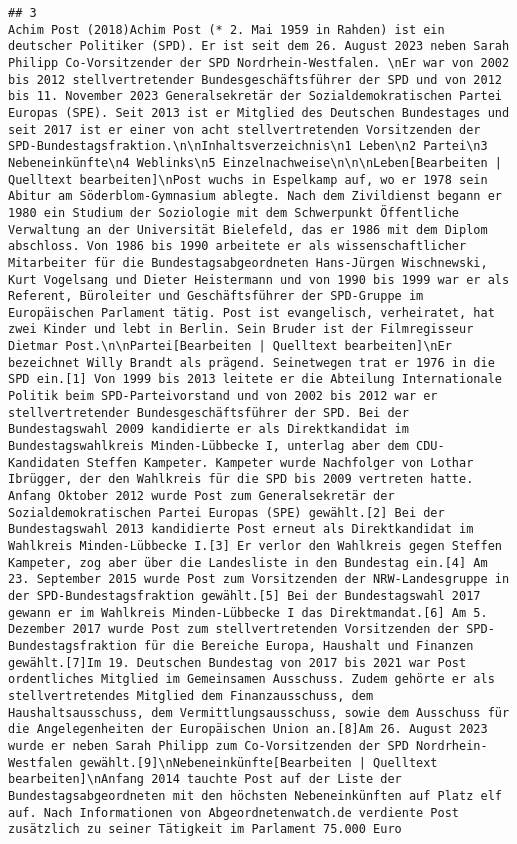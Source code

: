 \documentclass[
]{article}
\begin{document}
\begin{verbatim}
## 3                                                                                                 Achim Post (2018)Achim Post (* 2. Mai 1959 in Rahden) ist ein deutscher Politiker (SPD). Er ist seit dem 26. August 2023 neben Sarah Philipp Co-Vorsitzender der SPD Nordrhein-Westfalen. \nEr war von 2002 bis 2012 stellvertretender Bundesgeschäftsführer der SPD und von 2012 bis 11. November 2023 Generalsekretär der Sozialdemokratischen Partei Europas (SPE). Seit 2013 ist er Mitglied des Deutschen Bundestages und seit 2017 ist er einer von acht stellvertretenden Vorsitzenden der SPD-Bundestagsfraktion.\n\nInhaltsverzeichnis\n1 Leben\n2 Partei\n3 Nebeneinkünfte\n4 Weblinks\n5 Einzelnachweise\n\n\nLeben[Bearbeiten | Quelltext bearbeiten]\nPost wuchs in Espelkamp auf, wo er 1978 sein Abitur am Söderblom-Gymnasium ablegte. Nach dem Zivildienst begann er 1980 ein Studium der Soziologie mit dem Schwerpunkt Öffentliche Verwaltung an der Universität Bielefeld, das er 1986 mit dem Diplom abschloss. Von 1986 bis 1990 arbeitete er als wissenschaftlicher Mitarbeiter für die Bundestagsabgeordneten Hans-Jürgen Wischnewski, Kurt Vogelsang und Dieter Heistermann und von 1990 bis 1999 war er als Referent, Büroleiter und Geschäftsführer der SPD-Gruppe im Europäischen Parlament tätig. Post ist evangelisch, verheiratet, hat zwei Kinder und lebt in Berlin. Sein Bruder ist der Filmregisseur Dietmar Post.\n\nPartei[Bearbeiten | Quelltext bearbeiten]\nEr bezeichnet Willy Brandt als prägend. Seinetwegen trat er 1976 in die SPD ein.[1] Von 1999 bis 2013 leitete er die Abteilung Internationale Politik beim SPD-Parteivorstand und von 2002 bis 2012 war er stellvertretender Bundesgeschäftsführer der SPD. Bei der Bundestagswahl 2009 kandidierte er als Direktkandidat im Bundestagswahlkreis Minden-Lübbecke I, unterlag aber dem CDU-Kandidaten Steffen Kampeter. Kampeter wurde Nachfolger von Lothar Ibrügger, der den Wahlkreis für die SPD bis 2009 vertreten hatte. Anfang Oktober 2012 wurde Post zum Generalsekretär der Sozialdemokratischen Partei Europas (SPE) gewählt.[2] Bei der Bundestagswahl 2013 kandidierte Post erneut als Direktkandidat im Wahlkreis Minden-Lübbecke I.[3] Er verlor den Wahlkreis gegen Steffen Kampeter, zog aber über die Landesliste in den Bundestag ein.[4] Am 23. September 2015 wurde Post zum Vorsitzenden der NRW-Landesgruppe in der SPD-Bundestagsfraktion gewählt.[5] Bei der Bundestagswahl 2017 gewann er im Wahlkreis Minden-Lübbecke I das Direktmandat.[6] Am 5. Dezember 2017 wurde Post zum stellvertretenden Vorsitzenden der SPD-Bundestagsfraktion für die Bereiche Europa, Haushalt und Finanzen gewählt.[7]Im 19. Deutschen Bundestag von 2017 bis 2021 war Post ordentliches Mitglied im Gemeinsamen Ausschuss. Zudem gehörte er als stellvertretendes Mitglied dem Finanzausschuss, dem Haushaltsausschuss, dem Vermittlungsausschuss, sowie dem Ausschuss für die Angelegenheiten der Europäischen Union an.[8]Am 26. August 2023 wurde er neben Sarah Philipp zum Co-Vorsitzenden der SPD Nordrhein-Westfalen gewählt.[9]\nNebeneinkünfte[Bearbeiten | Quelltext bearbeiten]\nAnfang 2014 tauchte Post auf der Liste der Bundestagsabgeordneten mit den höchsten Nebeneinkünften auf Platz elf auf. Nach Informationen von Abgeordnetenwatch.de verdiente Post zusätzlich zu seiner Tätigkeit im Parlament 75.000 Euro 
\end{verbatim}
\end{document}

